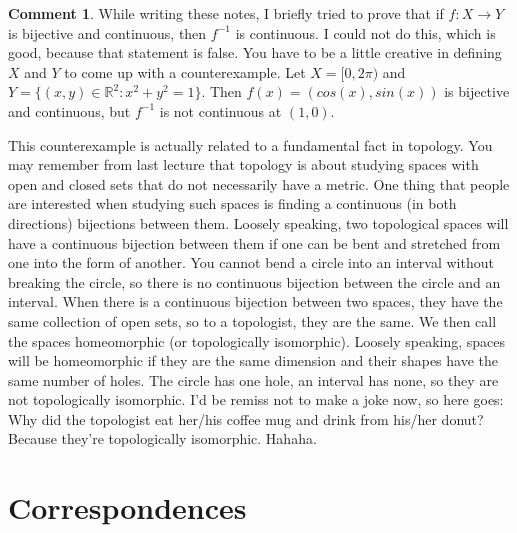 \documentclass[12pt,reqno]{amsart}
\theoremstyle{definition}
\newtheorem{remark}{Comment}[section]
\def\R{\mathbb{R}}
\renewcommand{\to}{{\rightarrow}}
\begin{document}
\begin{remark}
  While writing these notes, I briefly tried to prove that if $f:X \to
  Y$ is bijective and continuous, then $f^{-1}$ is continuous. I could
  not do this, which is good, because that statement is false. You have
  to be a little creative in defining $X$ and $Y$ to come up with a
  counterexample. Let $X = [0,2\pi)$ and $Y = \{(x,y) \in \R^2: x^2 +
  y^2 = 1 \}$. Then $f(x) = (cos(x), sin(x))$ is bijective and
  continuous, but $f^{-1}$ is not continuous at $(1,0)$. 
  
  This counterexample is actually related to a fundamental fact in
  topology. You may remember from last lecture that topology is about
  studying spaces with open and closed sets that do not necessarily
  have a metric. One thing that people are interested when studying
  such spaces is finding a continuous (in both directions) bijections
  between them. Loosely speaking, two topological spaces will have a
  continuous bijection between them if one can be bent and stretched
  from one into the form of another. You cannot bend a circle into an
  interval without breaking the circle, so there is no continuous
  bijection between the circle and an interval. When there is a
  continuous bijection between two spaces, they have the same
  collection of open sets, so to a topologist, they are the same. We
  then call the spaces homeomorphic (or topologically
  isomorphic). Loosely speaking, spaces will be homeomorphic if they
  are the same dimension and their shapes have the same number of
  holes.  The circle has one hole, an interval has none, so they are
  not topologically isomorphic. I'd be remiss not to make a joke now,
  so here goes: Why did the topologist eat her/his coffee mug and
  drink from his/her donut?  Because they're topologically
  isomorphic. Hahaha.
\end{remark}

\section{Correspondences \label{sec:corr}} 
\end{document}
